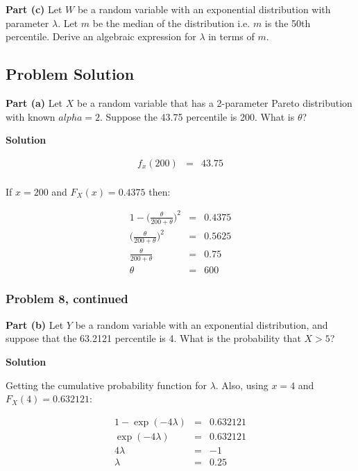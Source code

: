 \documentclass[12pt]{article}
\theoremstyle{definition}
\begin{document}
\bigskip
\noindent
{\bf Part (c)} Let $W$ be a random variable with an exponential distribution with parameter $\lambda$. Let $m$ be the median of the distribution i.e. $m$ is the 50th percentile. Derive an algebraic expression for $\lambda$ in terms of $m$.




\subsection*{Problem Solution}

\noindent
{\bf Part (a)} Let $X$ be a random variable that has a 2-parameter Pareto distribution with known $alpha = 2$. Suppose the 43.75 percentile is 200. What is $\theta$?

\bigskip
\noindent
{\bf Solution}

\begin{eqnarray*}
f_x(200) & = & 43.75 \\
\end{eqnarray*}

If $x = 200$ and $F_X(x) = 0.4375$ then:

\begin{eqnarray*}
1 - \Bigg( \frac{\theta}{200 + \theta }\Bigg)^2 & = & 0.4375 \\
\Bigg( \frac{\theta}{200 + \theta} \Bigg)^2 & = & 0.5625 \\
\frac{\theta}{200 + \theta} & = & 0.75 \\
\theta & = & 600
\end{eqnarray*}

\newpage
\subsubsection*{Problem 8, continued}


\vspace{2in}
\noindent
{\bf Part (b)} Let $Y$ be a random variable with an exponential distribution, and suppose that the 63.2121 percentile is 4. What is the probability that $X > 5$?

\bigskip
\noindent
{\bf Solution}

Getting the cumulative probability function for $\lambda$.  Also, using $x = 4$ and $F_X(4) = 0.632121$:

\begin{eqnarray*}
1 - \exp{(-4\lambda)} & = & 0.632121 \\
\exp{(-4\lambda)} & = & 0.632121 \\
4\lambda & = & - 1 \\
\lambda & = & 0.25 \\
\end{eqnarray*}
\end{document}
